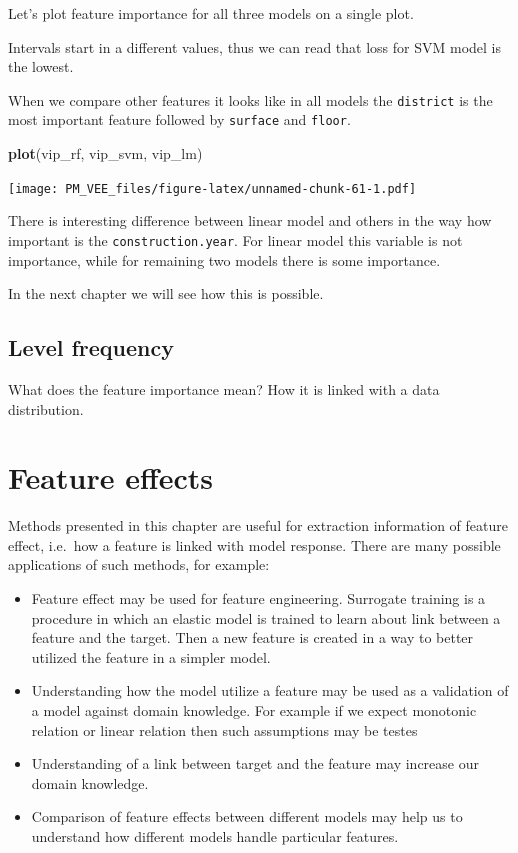 \documentclass[]{krantz}
\newenvironment{Shaded}{\begin{snugshade}}{\end{snugshade}}
\newcommand{\KeywordTok}[1]{\textcolor[rgb]{0.13,0.29,0.53}{\textbf{#1}}}
\newcommand{\NormalTok}[1]{#1}
\providecommand{\tightlist}{%
  \setlength{\itemsep}{0pt}\setlength{\parskip}{0pt}}
\theoremstyle{definition}
\theoremstyle{definition}
\theoremstyle{definition}
\theoremstyle{remark}
\begin{document}
Let's plot feature importance for all three models on a single plot.

Intervals start in a different values, thus we can read that loss for
SVM model is the lowest.

When we compare other features it looks like in all models the
\texttt{district} is the most important feature followed by
\texttt{surface} and \texttt{floor}.

\begin{Shaded}
\begin{Highlighting}[]
\KeywordTok{plot}\NormalTok{(vip_rf, vip_svm, vip_lm)}
\end{Highlighting}
\end{Shaded}

\texttt{[image: PM\_VEE\_files/figure-latex/unnamed-chunk-61-1.pdf]}

There is interesting difference between linear model and others in the
way how important is the \texttt{construction.year}. For linear model
this variable is not importance, while for remaining two models there is
some importance.

In the next chapter we will see how this is possible.

\hypertarget{level-frequency}{%
\subsection{Level frequency}\label{level-frequency}}

What does the feature importance mean? How it is linked with a data
distribution.

\hypertarget{variableEngeneering}{%
\section{Feature effects}\label{variableEngeneering}}

Methods presented in this chapter are useful for extraction information
of feature effect, i.e.~how a feature is linked with model response.
There are many possible applications of such methods, for example:

\begin{itemize}
\tightlist
\item
  Feature effect may be used for feature engineering. Surrogate training
  is a procedure in which an elastic model is trained to learn about
  link between a feature and the target. Then a new feature is created
  in a way to better utilized the feature in a simpler model.
\item
  Understanding how the model utilize a feature may be used as a
  validation of a model against domain knowledge. For example if we
  expect monotonic relation or linear relation then such assumptions may
  be testes
\item
  Understanding of a link between target and the feature may increase
  our domain knowledge.
\item
  Comparison of feature effects between different models may help us to
  understand how different models handle particular features.
\end{itemize}
\end{document}
